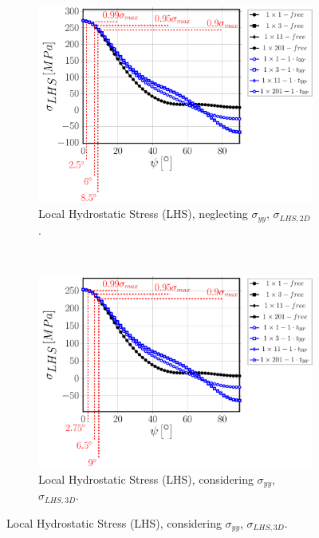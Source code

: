 \begin{figure}[!hp]
    \begin{subfigure}[b]{0.4\textwidth}
        \includegraphics[width=\textwidth]{paperE/vf60-nodamage-p2D.pdf}
        \caption{Local Hydrostatic Stress (LHS), neglecting $\sigma_{yy}$, $\sigma_{LHS,2D}$.}\label{chap3:paperE:fig:stress-c}
    \end{subfigure} ~
    \begin{subfigure}[b]{0.4\textwidth}
        \includegraphics[width=\textwidth]{paperE/vf60-nodamage-p3D.pdf}
        \caption{Local Hydrostatic Stress (LHS), considering $\sigma_{yy}$, $\sigma_{LHS,3D}$.}\label{chap3:paperE:fig:stress-d}
    \end{subfigure}


\end{figure}
